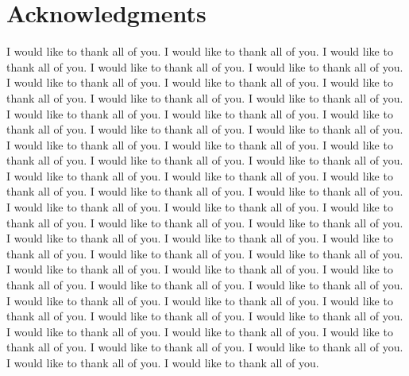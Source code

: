  \thispagestyle{empty}
 \chapter*{Acknowledgments}
 
 
I would like to thank all of you. I would like to thank all of you. I would like to thank all of you. I would like to thank all of you. 
I would like to thank all of you. I would like to thank all of you. I would like to thank all of you. I would like to thank all of you. 
I would like to thank all of you. I would like to thank all of you. I would like to thank all of you. I would like to thank all of you. 
I would like to thank all of you. I would like to thank all of you. I would like to thank all of you. I would like to thank all of you. 
I would like to thank all of you. I would like to thank all of you. I would like to thank all of you. I would like to thank all of you. 
I would like to thank all of you. I would like to thank all of you. I would like to thank all of you. I would like to thank all of you. 
I would like to thank all of you. I would like to thank all of you. I would like to thank all of you. I would like to thank all of you. 
I would like to thank all of you. I would like to thank all of you. I would like to thank all of you. I would like to thank all of you. 
I would like to thank all of you. I would like to thank all of you. I would like to thank all of you. I would like to thank all of you. 
I would like to thank all of you. I would like to thank all of you. I would like to thank all of you. I would like to thank all of you. 
I would like to thank all of you. I would like to thank all of you. I would like to thank all of you. I would like to thank all of you. 
I would like to thank all of you. I would like to thank all of you. I would like to thank all of you. I would like to thank all of you. 
I would like to thank all of you. I would like to thank all of you. I would like to thank all of you. I would like to thank all of you. 